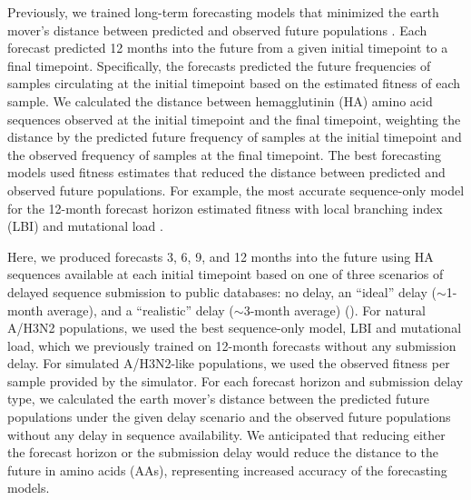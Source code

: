 \documentclass[9pt,lineno]{elife}
\begin{document}
Previously, we trained long-term forecasting models that minimized the earth mover's distance \citep{Rubner1998} between predicted and observed future populations \citep{Huddleston2020}.
Each forecast predicted 12 months into the future from a given initial timepoint to a final timepoint.
Specifically, the forecasts predicted the future frequencies of samples circulating at the initial timepoint based on the estimated fitness of each sample.
We calculated the distance between hemagglutinin (HA) amino acid sequences observed at the initial timepoint and the final timepoint, weighting the distance by the predicted future frequency of samples at the initial timepoint and the observed frequency of samples at the final timepoint.
The best forecasting models used fitness estimates that reduced the distance between predicted and observed future populations.
For example, the most accurate sequence-only model for the 12-month forecast horizon estimated fitness with local branching index (LBI) \citep{Neher:2014eu} and mutational load \citep{Luksza:2014hj}.

Here, we produced forecasts 3, 6, 9, and 12 months into the future using HA sequences available at each initial timepoint based on one of three scenarios of delayed sequence submission to public databases: no delay, an ``ideal'' delay ($\sim$1-month average), and a ``realistic'' delay ($\sim$3-month average) ().
For natural A/H3N2 populations, we used the best sequence-only model, LBI and mutational load, which we previously trained on 12-month forecasts without any submission delay.
For simulated A/H3N2-like populations, we used the observed fitness per sample provided by the simulator.
For each forecast horizon and submission delay type, we calculated the earth mover's distance between the predicted future populations under the given delay scenario and the observed future populations without any delay in sequence availability.
We anticipated that reducing either the forecast horizon or the submission delay would reduce the distance to the future in amino acids (AAs), representing increased accuracy of the forecasting models.
\end{document}
